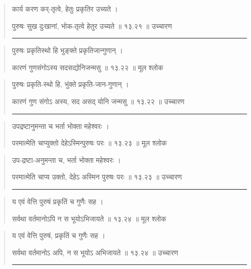 \begin{quotation}

कार्य करण कर्-तृत्वे, हेतुः प्रकृतिर उच्यते  ।  

पुरुषः सुख दुःखानां, भोक-तृत्वे हेतुर उच्यते  ॥ १३.२१ ॥  उच्चारण

\noindent\rule{16cm}{0.4pt} 
\end{quotation}


\begin{quotation}

पुरुषः प्रकृतिस्थो हि भुङ्‍क्ते प्रकृतिजान्गुणान्‌  ।  

कारणं गुणसंगोऽस्य सदसद्योनिजन्मसु  ॥ १३.२२ ॥  मूल श्लोक
\end{quotation}

\begin{quotation}

पुरुषः प्रकृति-स्थो हि, भुंक्ते प्रकृति-जान-गुणान्‌  ।  

कारणं गुण संगोऽ अस्य, सद असद् योनि जन्मसु  ॥ १३.२२ ॥  उच्चारण

\noindent\rule{16cm}{0.4pt} 
\end{quotation}


\begin{quotation}

उपद्रष्टानुमन्ता च भर्ता भोक्ता महेश्वरः  ।  

परमात्मेति चाप्युक्तो देहेऽस्मिन्पुरुषः परः  ॥ १३.२३ ॥  मूल श्लोक
\end{quotation}

\begin{quotation}
उप-द्रष्टा-अनुमन्ता च, भर्ता भोक्ता महेश्वरः  ।  

परमात्मेति चाप्य उक्तो, देहेऽ अस्मिन पुरुषः परः  ॥ १३.२३ ॥  उच्चारण

\noindent\rule{16cm}{0.4pt} 
\end{quotation}


\begin{quotation}

य एवं वेत्ति पुरुषं प्रकृतिं च गुणैः सह  ।  

सर्वथा वर्तमानोऽपि न स भूयोऽभिजायते  ॥ १३.२४ ॥  मूल श्लोक
\end{quotation}

\begin{quotation}

य एवं वेत्ति पुरुषं, प्रकृतिं च गुणैः सह  ।  

सर्वथा वर्तमानोऽ अपि, न स भूयोऽ अभिजायते  ॥ १३.२४ ॥  उच्चारण

\noindent\rule{16cm}{0.4pt} 
\end{quotation}


